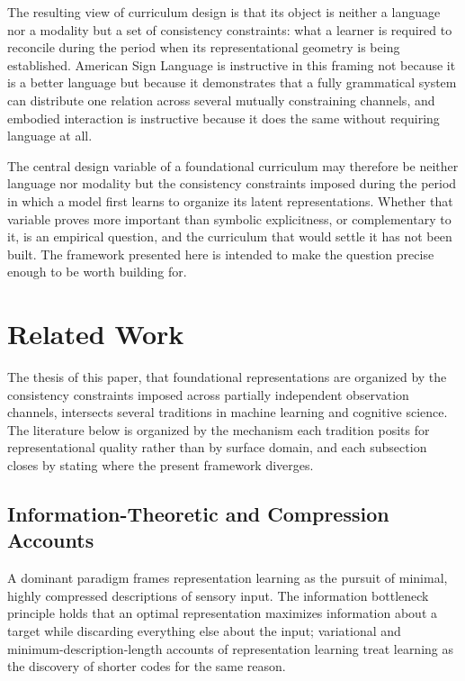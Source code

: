 \documentclass[11pt]{article}
\begin{document}
The resulting view of curriculum design is that its object is neither a language nor a modality but a set of consistency constraints: what a learner is required to reconcile during the period when its representational geometry is being established. American Sign Language is instructive in this framing not because it is a better language but because it demonstrates that a fully grammatical system can distribute one relation across several mutually constraining channels, and embodied interaction is instructive because it does the same without requiring language at all.

The central design variable of a foundational curriculum may therefore be neither language nor modality but the consistency constraints imposed during the period in which a model first learns to organize its latent representations. Whether that variable proves more important than symbolic explicitness, or complementary to it, is an empirical question, and the curriculum that would settle it has not been built. The framework presented here is intended to make the question precise enough to be worth building for.


\section{Related Work}
\label{sec:related}

The thesis of this paper, that foundational representations are organized by the consistency constraints imposed across partially independent observation channels, intersects several traditions in machine learning and cognitive science. The literature below is organized by the mechanism each tradition posits for representational quality rather than by surface domain, and each subsection closes by stating where the present framework diverges.

\subsection{Information-Theoretic and Compression Accounts}
\label{sec:rel-compression}

A dominant paradigm frames representation learning as the pursuit of minimal, highly compressed descriptions of sensory input. The information bottleneck principle \cite{tishby2000information} holds that an optimal representation maximizes information about a target while discarding everything else about the input; variational and minimum-description-length accounts of representation learning \cite{rissanen1978modeling, hinton1993keeping, kingma2013auto} treat learning as the discovery of shorter codes for the same reason.
\end{document}
